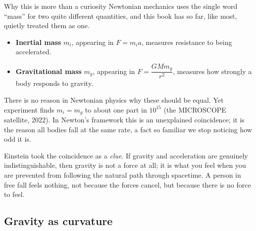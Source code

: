 \begin{figure}[htbp]
\centering
{}
\end{figure}

\begin{remarkbox}{Why this is more than a curiosity}
Newtonian mechanics uses the single word ``mass'' for two quite different quantities, and this book has
so far, like most, quietly treated them as one.
\begin{itemize}
\item \textbf{Inertial mass} $m_i$, appearing in $F=m_ia$, measures resistance to being accelerated.
\item \textbf{Gravitational mass} $m_g$, appearing in $F=\dfrac{GMm_g}{r^{2}}$, measures how strongly a
      body responds to gravity.
\end{itemize}
There is no reason in Newtonian physics why these should be equal. Yet experiment finds
$m_i=m_g$ to about one part in $10^{15}$ (the MICROSCOPE satellite, 2022). In Newton's framework this is an unexplained
coincidence; it is the reason all bodies fall at the same rate, a fact so familiar we stop noticing how
odd it is.

\smallskip
Einstein took the coincidence as a \emph{clue}. If gravity and acceleration are genuinely
indistinguishable, then gravity is not a force at all; it is what you feel when you are prevented from
following the natural path through spacetime. A person in free fall feels nothing, not because the
forces cancel, but because there is no force to feel.
\end{remarkbox}


\subsection{Gravity as curvature}

